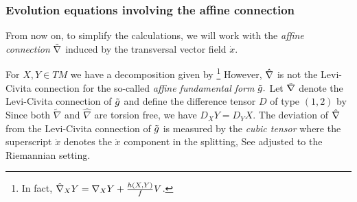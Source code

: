 \subsubsection{Evolution equations involving the affine connection}
From now on, to simplify the calculations, we will work with the {\it{affine connection}} $\~\n$ induced by the transversal vector field $\dot{x}.$

For $X,Y\in T M$ we have a decomposition given by \footnote{In fact, $\hat\n_{X}Y=\n_{X}Y+\frac{h(X,Y)}{f}V$.}
However, $\hat{\n}$ is not the Levi-Civita connection for the so-called {\it{affine fundamental form}} $\~g.$ Let $\~{\n}$ denote the Levi-Civita connection of $\~g$ and define the difference tensor $D$ of type $(1,2)$ by
Since both $\tilde{\nabla}$ and $\hat{\nabla}$ are torsion free, we have $D_XY=D_YX.$
The deviation of $\hat{\n}$ from the Levi-Civita connection of $\~g$ is measured by the {\it{cubic tensor}}
where the superscript $\dot{x}$ denotes the $\dot{x}$ component in the splitting, 
See \cite[Prop.~4.1]{NomizuSasaki:/1994} adjusted to the Riemannian setting.
